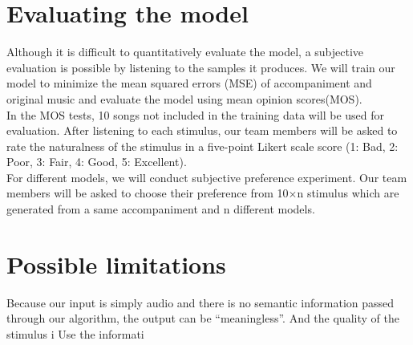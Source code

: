 \documentclass[twoside,11pt]{article}
\begin{document}
\section{Evaluating the model} 
Although it is difficult to quantitatively evaluate the model, a subjective evaluation is possible by listening to the samples it produces. We will train our model to minimize the mean squared errors (MSE) of accompaniment and original music and evaluate the model using mean opinion scores(MOS).\\

In the MOS tests, 10 songs not included in the training data will be used for evaluation. After listening to each stimulus, our team members will be asked to rate the naturalness of the stimulus in a five-point Likert scale score (1: Bad, 2: Poor, 3: Fair, 4: Good, 5: Excellent).\\

For different models, we will conduct subjective preference experiment. Our team members will be asked to choose their preference from 10×n stimulus which are generated from a same accompaniment and n different models.\\

\section{Possible limitations} 

Because our input is simply audio and there is no semantic information passed through our algorithm, the output can be “meaningless”. And the quality of the stimulus i Use the informati



\end{document}
